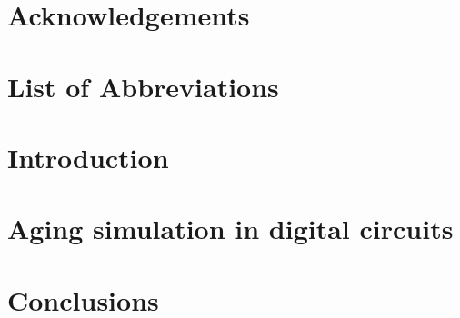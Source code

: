 \documentclass[
    12pt,
    twoside, 
    ]{report}
\author{Andrés Santana Andreo}
\begin{document}
\newcommand{\longstring}[1]{{\ttfamily\seqsplit{#1}}}
\thispagestyle{empty}
\maketitle
\chapter*{Acknowledgements}

\chapter*{List of Abbreviations}
\printglossaries
\tableofcontents{\small}
\listoffigures
\listoftables


\chapter{Introduction}

\chapter{Aging simulation in digital circuits}

% 
% 
% 
% 
\chapter{Conclusions}




% 

\printbibliography{}

\clearpage



\clearpage
\end{document}
